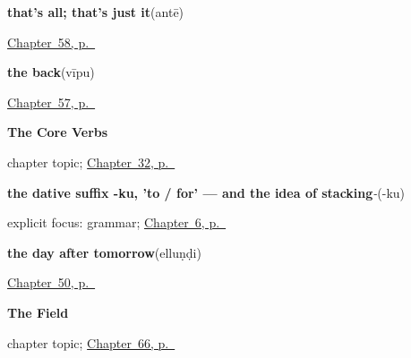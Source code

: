 \noindent\begin{minipage}[t]{\linewidth}
\raggedright
\textbf{that's all; that's just it}\enspace\emph{}\enspace(antē)\par
\footnotesize \hyperref[ch:te-more-replies]{Chapter~58, p.~\pageref*{ch:te-more-replies}}
\end{minipage}\par\smallskip

\noindent\begin{minipage}[t]{\linewidth}
\raggedright
\textbf{the back}\enspace\emph{}\enspace(vīpu)\par
\footnotesize \hyperref[ch:te-more-body]{Chapter~57, p.~\pageref*{ch:te-more-body}}
\end{minipage}\par\smallskip

\noindent\begin{minipage}[t]{\linewidth}
\raggedright
\textbf{The Core Verbs}\par
\footnotesize chapter topic; \hyperref[ch:te-core-verbs]{Chapter~32, p.~\pageref*{ch:te-core-verbs}}
\end{minipage}\par\smallskip

\noindent\begin{minipage}[t]{\linewidth}
\raggedright
\textbf{the dative suffix -ku, 'to / for' — and the idea of stacking}\enspace\emph{-}\enspace(-ku)\par
\footnotesize explicit focus: grammar; \hyperref[ch:te-dative-case]{Chapter~6, p.~\pageref*{ch:te-dative-case}}
\end{minipage}\par\smallskip

\noindent\begin{minipage}[t]{\linewidth}
\raggedright
\textbf{the day after tomorrow}\enspace\emph{}\enspace(elluṇḍi)\par
\footnotesize \hyperref[ch:te-leave-more]{Chapter~50, p.~\pageref*{ch:te-leave-more}}
\end{minipage}\par\smallskip

\noindent\begin{minipage}[t]{\linewidth}
\raggedright
\textbf{The Field}\par
\footnotesize chapter topic; \hyperref[ch:te-the-field]{Chapter~66, p.~\pageref*{ch:te-the-field}}
\end{minipage}\par\smallskip

